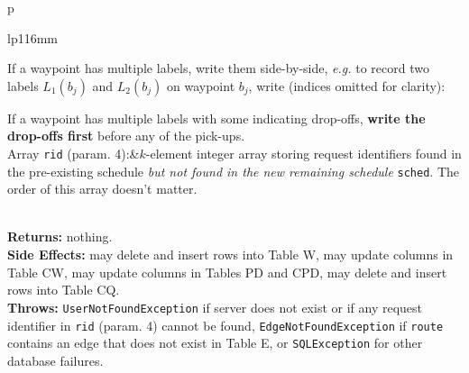 \begin{tabular}{p{\textwidth}}
\begin{tabular}{lp{116mm}}

If a waypoint has multiple labels, write them side-by-side, \textit{e.g.}
to record two labels $L_1(b_j)$ and $L_2(b_j)$ on waypoint $b_j$, write
(indices omitted for clarity):


If a waypoint has multiple labels with some indicating drop-offs, \textbf{write
the drop-offs first} before any of the pick-ups.\\
Array {\tt{}rid} (param. 4):&$k$-element integer array storing request
identifiers found in the pre-existing schedule \emph{but not found in the new
remaining schedule} {\tt{}sched}. The order of this array doesn't matter.
\end{tabular}\\
\textbf{Returns:} nothing.\\
\textbf{Side Effects:} may delete and insert rows into Table W, may
update columns in Table CW, may update columns in Tables PD and CPD,
may delete and insert rows into Table CQ.\\
\textbf{Throws:} {\tt{}UserNotFoundException} if server does not exist or if
any request identifier in {\tt{}rid} (param. 4) cannot be found,
{\tt{}EdgeNotFoundException} if {\tt{}route} contains an edge that does not exist
in Table E, or {\tt{}SQLException} for other database failures.\\
\bottomrule
\end{tabular}
\nwenddocs{}\endmoddef{}
